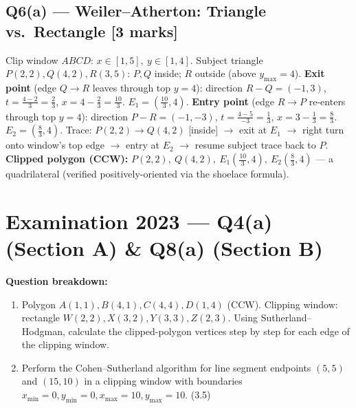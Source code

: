 \documentclass[12pt, a4paper]{article}
\newenvironment{solutionbox}{\begin{mdframed}[style=solutionframe]}{\end{mdframed}}
\begin{document}
\subsection*{Q6(a) --- Weiler--Atherton: Triangle vs.\ Rectangle [3 marks]}
\begin{solutionbox}
Clip window $ABCD$: $x\in[1,5],\ y\in[1,4]$. Subject triangle $P(2,2),Q(4,2),R(3,5)$: $P,Q$ inside; $R$ outside (above $y_{\max}=4$).
\textbf{Exit point} (edge $Q\to R$ leaves through top $y=4$): direction $R-Q=(-1,3)$, $t=\frac{4-2}{3}=\frac23$, $x=4-\frac23=\frac{10}{3}$. $E_1=\left(\tfrac{10}{3},4\right)$.
\textbf{Entry point} (edge $R\to P$ re-enters through top $y=4$): direction $P-R=(-1,-3)$, $t=\frac{4-5}{-3}=\frac13$, $x=3-\frac13=\frac83$. $E_2=\left(\tfrac{8}{3},4\right)$.
Trace: $P(2,2)\to Q(4,2)$ [inside] $\to$ exit at $E_1$ $\to$ right turn onto window's top edge $\to$ entry at $E_2$ $\to$ resume subject trace back to $P$.
\textbf{Clipped polygon (CCW):} $P(2,2),\ Q(4,2),\ E_1\!\left(\tfrac{10}{3},4\right),\ E_2\!\left(\tfrac{8}{3},4\right)$ --- a quadrilateral (verified positively-oriented via the shoelace formula).
\end{solutionbox}

\section{Examination 2023 --- Q4(a) (Section A) \& Q8(a) (Section B)}
\begin{solutionbox}
\textbf{Question breakdown:}
\begin{enumerate}[noitemsep]
  \item[Q4(a)] Polygon $A(1,1),B(4,1),C(4,4),D(1,4)$ (CCW). Clipping window: rectangle $W(2,2),X(3,2),Y(3,3),Z(2,3)$. Using Sutherland--Hodgman, calculate the clipped-polygon vertices step by step for each edge of the clipping window.
  \item[Q8(a)] Perform the Cohen--Sutherland algorithm for line segment endpoints $(5,5)$ and $(15,10)$ in a clipping window with boundaries $x_{\min}=0,y_{\min}=0,x_{\max}=10,y_{\max}=10$. (3.5)
\end{enumerate}
\end{solutionbox}
\end{document}
